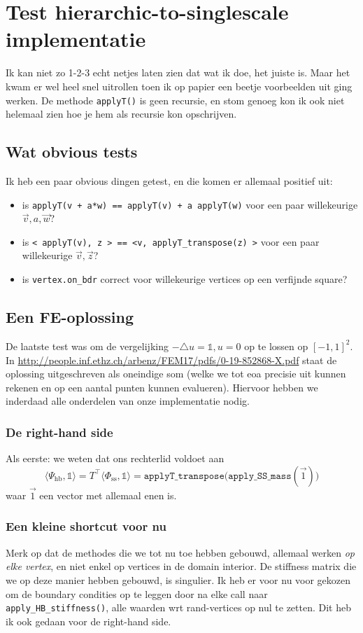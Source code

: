 \documentclass[11pt,a4paper]{amsart}
\theoremstyle{definition}
\newcommand{\bbone}{\mathds{1}}
\begin{document}
\section*{Test hierarchic-to-singlescale implementatie}
Ik kan niet zo 1-2-3 echt netjes laten zien dat wat ik doe, het juiste is. Maar
het kwam er wel heel snel uitrollen toen ik op papier een beetje voorbeelden uit
ging werken. De methode \texttt{applyT()} is geen recursie, en stom genoeg kon ik
ook niet helemaal zien hoe je hem als recursie kon opschrijven.

\subsection*{Wat obvious tests}
Ik heb een paar obvious dingen getest, en die komen er allemaal positief uit:
\begin{itemize}
  \item is \texttt{applyT(v + a*w) == applyT(v) + a applyT(w)} voor een paar willekeurige $\vec v, a, \vec w$?
  \item is \texttt{< applyT(v), z > == <v, applyT\_transpose(z) >} voor een paar willekeurige $\vec v, \vec z$?
  \item is \texttt{vertex.on\_bdr} correct voor willekeurige vertices op een verfijnde square?
\end{itemize}

\subsection*{Een FE-oplossing}
De laatste test was om de vergelijking $- \triangle u = \bbone, u = 0$ op te lossen op $[-1,1]^2$.
In \url{http://people.inf.ethz.ch/arbenz/FEM17/pdfs/0-19-852868-X.pdf} staat
de oplossing uitgeschreven als oneindige som (welke we tot eoa precisie uit
kunnen rekenen en op een aantal punten kunnen evalueren). Hiervoor hebben we
inderdaad alle onderdelen van onze implementatie nodig.

\subsubsection*{De right-hand side} Als eerste: we weten dat ons rechterlid voldoet aan
\[
  \langle \Psi_{\text{hb}}, \bbone\rangle = T^\top \langle \Phi_{\text{ss}}, \bbone\rangle =
  \mathtt{applyT\_transpose(apply\_SS\_mass}(\vec 1))
\]
waar $\vec 1$ een vector met allemaal enen is.

\subsubsection*{Een kleine shortcut voor nu}
Merk op dat de methodes die we tot nu toe hebben gebouwd, allemaal werken
\emph{op elke vertex}, en niet enkel op vertices in de domain interior. De
stiffness matrix die we op deze manier hebben gebouwd, is singulier. Ik heb er
voor nu voor gekozen om de boundary condities op te leggen door na elke call naar
\texttt{apply\_HB\_stiffness()}, alle waarden wrt rand-vertices op nul te zetten.
Dit heb ik ook gedaan voor de right-hand side.
\end{document}
